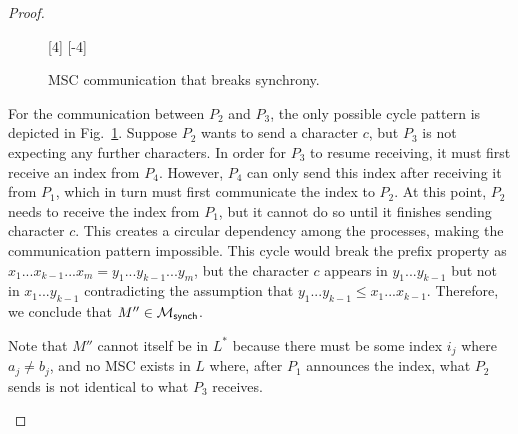 \begin{proof}
\begin{itemize}
\begin{figure}[!ht]
\begin{msc}[draw frame=none, draw head=none, msc keyword=, head height=0px, label distance=0.5ex, foot height=0px, foot distance=0px]{}
				      [4]%
				      \nextlevel
				      \nextlevel
				      [-4]
			      \end{msc}
			      \caption{MSC communication that breaks synchrony.} %
			      \label{fig:cycle2}
		      \end{figure}

		      For the communication between $P_2$ and $P_3$, the only possible cycle
		      pattern is depicted in Fig.~\ref{fig:cycle2}.
		      Suppose $P_2$ wants to send a character $c$, but $P_3$
		      is not expecting any further characters. In order for
		      $P_3$ to resume receiving, it must first receive an index
		      from $P_4$. However, $P_4$ can only send this index
		      after receiving it from $P_1$, which in turn must first
		      communicate the index to $P_2$.
		      At this point, $P_2$ needs to receive the index from
		      $P_1$, but it cannot do so until it finishes sending
		      character $c$. This creates a circular dependency among the
		      processes, making the communication pattern impossible. %
		      This cycle would break the prefix property as
		      $x_1...x_{k-1}...x_m= y_1...y_{k-1}...y_m$, but the character $c$ appears
		      in $y_1...y_{k-1}$ but not in $x_1...y_{k-1}$ contradicting the
		      assumption that $y_1...y_{k-1} \leq x_1...x_{k-1}$.
		      Therefore, we conclude that $M'' \in \mathcal{M}_{\mathsf{synch}}$.

		      Note that $M''$ cannot itself be in $L^*$ because there must be
		      some index $i_j$ where $a_j \neq b_j$, and no MSC exists in $L$ where,
		      after $P_1$ announces the index, what $P_2$ sends is not
		      identical to what $P_3$ receives.


\end{itemize}
\end{proof}
